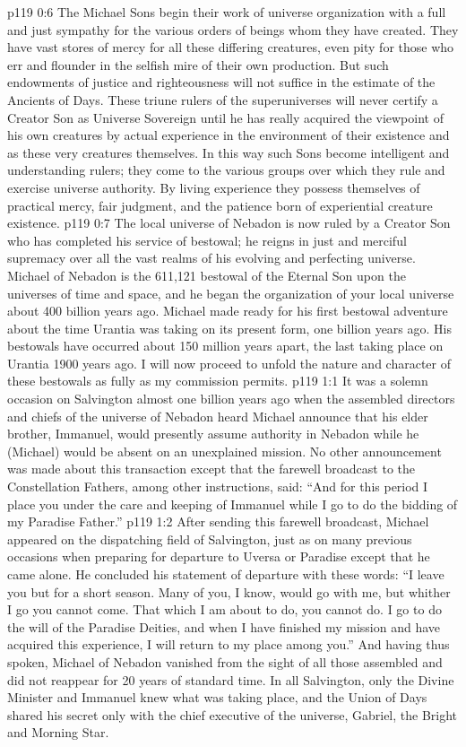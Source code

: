 \vs p119 0:6 The Michael Sons begin their work of universe organization with a full and just sympathy for the various orders of beings whom they have created. They have vast stores of mercy for all these differing creatures, even pity for those who err and flounder in the selfish mire of their own production. But such endowments of justice and righteousness will not suffice in the estimate of the Ancients of Days. These triune rulers of the superuniverses will never certify a Creator Son as Universe Sovereign until he has really acquired the viewpoint of his own creatures by actual experience in the environment of their existence and as these very creatures themselves. In this way such Sons become intelligent and understanding rulers; they come to  the various groups over which they rule and exercise universe authority. By living experience they possess themselves of practical mercy, fair judgment, and the patience born of experiential creature existence.
\vs p119 0:7 \pc The local universe of Nebadon is now ruled by a Creator Son who has completed his service of bestowal; he reigns in just and merciful supremacy over all the vast realms of his evolving and perfecting universe. Michael of Nebadon is the 611,121 bestowal of the Eternal Son upon the universes of time and space, and he began the organization of your local universe about 400 billion years ago. Michael made ready for his first bestowal adventure about the time Urantia was taking on its present form, one billion years ago. His bestowals have occurred about 150 million years apart, the last taking place on Urantia 1900 years ago. I will now proceed to unfold the nature and character of these bestowals as fully as my commission permits.
\vs p119 1:1 It was a solemn occasion on Salvington almost one billion years ago when the assembled directors and chiefs of the universe of Nebadon heard Michael announce that his elder brother, Immanuel, would presently assume authority in Nebadon while he (Michael) would be absent on an unexplained mission. No other announcement was made about this transaction except that the farewell broadcast to the Constellation Fathers, among other instructions, said: “And for this period I place you under the care and keeping of Immanuel while I go to do the bidding of my Paradise Father.”
\vs p119 1:2 After sending this farewell broadcast, Michael appeared on the dispatching field of Salvington, just as on many previous occasions when preparing for departure to Uversa or Paradise except that he came alone. He concluded his statement of departure with these words: “I leave you but for a short season. Many of you, I know, would go with me, but whither I go you cannot come. That which I am about to do, you cannot do. I go to do the will of the Paradise Deities, and when I have finished my mission and have acquired this experience, I will return to my place among you.” And having thus spoken, Michael of Nebadon vanished from the sight of all those assembled and did not reappear for 20 years of standard time. In all Salvington, only the Divine Minister and Immanuel knew what was taking place, and the Union of Days shared his secret only with the chief executive of the universe, Gabriel, the Bright and Morning Star.
